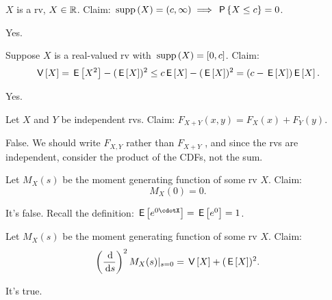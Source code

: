 \documentclass[tf-tutorial-all.tex]{subfiles}
\begin{document}


\begin{truefalse}
$X$ is a rv, $X  \in \mathbb{R}$. Claim: $\,\mathrm{supp}\left(X\right) = (c, \infty) \implies \,\mathsf{P}\left\{X\leq c\right\} = 0$.
\begin{solution}
Yes.
\end{solution}
\end{truefalse}

\begin{truefalse}
Suppose $X$ is a real-valued rv with $\,\mathrm{supp}\left(X\right) = [0, c]$. Claim:
\begin{equation}
\,\mathsf{V}\left[X\right] = \,\mathsf{E}\left[X^2\right] - (\,\mathsf{E}\left[X\right])^2 \leq c \,\mathsf{E}\left[X\right] - (\,\mathsf{E}\left[X\right])^2 = (c-\,\mathsf{E}\left[X\right])\,\mathsf{E}\left[X\right].
\end{equation}
\begin{solution}
Yes.
\end{solution}
\end{truefalse}


\begin{truefalse}
Let $X$ and $Y$ be independent rvs. Claim: $F_{X+Y}(x, y) = F_X(x) + F_{Y}(y)$.
\begin{solution}
False. We should write $F_{X,Y}$ rather than $F_{X+Y}$ , and since the rvs are independent, consider the product of the CDFs, not the sum.
\end{solution}
\end{truefalse}

\begin{truefalse}
Let $M_{X}(s)$ be the moment generating function of some rv $X$.  Claim:
\begin{equation}
M_{X}(0) = 0.
\end{equation}
\begin{solution}
It's false. Recall the definition: $\E{e^{0\cdotX}} = \E{e^0} = 1$.
\end{solution}
\end{truefalse}


\begin{truefalse}
Let $M_{X}(s)$ be the moment generating function of some rv $X$.  Claim:
\begin{equation}
\left(\frac{\d}{\d s}\right)^{2 }M_{X}(s)|_{s=0} =  \V X + (\E{X})^{2}.
\end{equation}
\begin{solution}
It's true.
\end{solution}
\end{truefalse}
\end{document}
